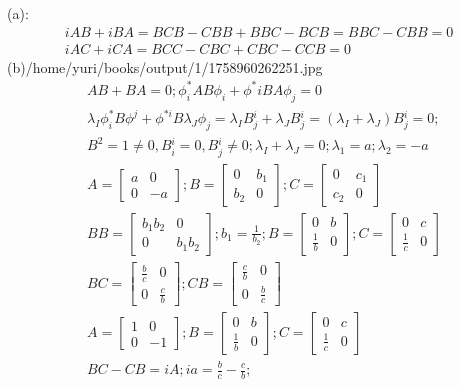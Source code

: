 \documentclass{article}
\begin{document}
(a):
\begin{align*}
  &iAB+iBA=BCB-CBB+BBC-BCB=BBC-CBB=0 \\
  &iAC+iCA=BCC-CBC+CBC-CCB=0&
\end{align*}
(b)/home/yuri/books/output/1/1758960262251.jpg
\begin{align*}
  &AB+BA=0;\phi^*_iAB\phi_i+\phi^*iBA\phi_j=0 \\
  &\lambda_I\phi^*_iB\phi^j+\phi^{*i}B\lambda_J\phi_j=\lambda_I B{^i_j}+\lambda_JB{^i_j}=(\lambda_I+\lambda_J)B{^i_j}=0;\\
  &B^2=1\ne0,B{^i_i}=0,B{^i_j}\ne0;\lambda_I+\lambda_J=0;\lambda_1=a;\lambda_2=-a \\
  &A=\begin{bmatrix}a&0\\0&-a\end{bmatrix};B=\begin{bmatrix}0&b_1\\b_2&0\end{bmatrix};C=\begin{bmatrix}0&c_1\\c_2&0\end{bmatrix} \\
  &BB=\begin{bmatrix}b_1b_2&0\\0&b_1b_2\end{bmatrix};b_1=\frac1{b_2};B=\begin{bmatrix}0&b\\\frac1b&0\end{bmatrix};C=\begin{bmatrix}0&c\\\frac1c&0\end{bmatrix} \\
  &BC=\begin{bmatrix}\frac bc&0\\0&\frac cb\end{bmatrix};CB=\begin{bmatrix}\frac cb&0\\0&\frac bc\end{bmatrix} \\
  &A=\begin{bmatrix}1&0\\0&-1\end{bmatrix};B=\begin{bmatrix}0&b\\\frac1b&0\end{bmatrix};C=\begin{bmatrix}0&c\\\frac1c&0\end{bmatrix} \\
  &BC-CB=iA;ia=\frac bc-\frac cb; \\
\end{align*}
\end{document}
